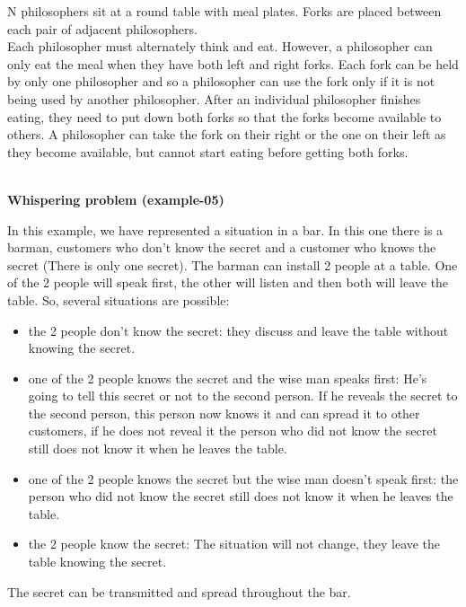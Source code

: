 \documentclass[11pt]{report}
\begin{document}
\tabto{0cm}N philosophers sit at a round table with meal plates. Forks are placed between each pair of adjacent philosophers.
\\ Each philosopher must alternately think and eat. However, a philosopher can only eat the meal when they have both left and right forks. Each fork can be held by only one philosopher and so a philosopher can use the fork only if it is not being used by another philosopher. After an individual philosopher finishes eating, they need to put down both forks so that the forks become available to others. A philosopher can take the fork on their right or the one on their left as they become available, but cannot start eating before getting both forks.
\\ \\
{}
\tabto{0cm} {\LARGE \textbf{Whispering problem (example-05)}}
\vspace*{3pt}
\vspace*{10pt}

\tabto{0cm}In this example, we have represented a situation in a bar. In this one there is a barman, customers who don't know the secret and a customer who knows the secret (There is only one secret). The barman can install 2 people at a table.  One of the 2 people will speak first, the other will listen and then both will leave the table. So, several situations are possible:
\begin{itemize}
    \item the 2 people don't know the secret: they discuss and leave the table without knowing the secret. \\
    \item  one of the 2 people knows the secret and the wise man speaks first: He's going to tell this secret or not to the second person. If he reveals the secret to the second person, this person now knows it and can spread it to other customers, if he does not reveal it the person who did not know the secret still does not know it when he leaves the table.   \\
    \item one of the 2 people knows the secret but the wise man doesn't speak first: the person who did not know the secret still does not know it when he leaves the table. \\
    \item the 2 people know the secret: The situation will not change, they leave the table knowing the secret.
\end{itemize}
The secret can be transmitted and spread throughout the bar.
\end{document}

